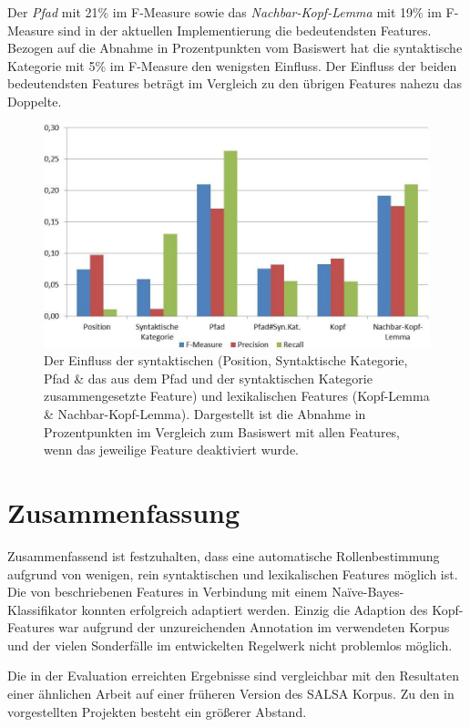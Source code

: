 \documentclass[12pt]{article}
\begin{document}
Der \textit{Pfad} mit 21\% im F-Measure sowie das \textit{Nachbar-Kopf-Lemma} mit 19\% im F-Measure sind in der aktuellen Implementierung die bedeutendsten Features. Bezogen auf die Abnahme in Prozentpunkten vom Basiswert hat die syntaktische Kategorie mit 5\% im F-Measure den wenigsten Einfluss. Der Einfluss der beiden bedeutendsten Features beträgt im Vergleich zu den übrigen Features nahezu das Doppelte.

	\begin{figure}[tb!]
		\centering		
		\includegraphics[scale=0.9]{images/featureImpact_sorted.jpg}
		\caption[Einfluss der genutzten Features]{Der Einfluss der syntaktischen (Position, Syntaktische Kategorie, Pfad \& das aus dem Pfad und der syntaktischen Kategorie zusammengesetzte Feature) und lexikalischen Features (Kopf-Lemma \& Nachbar-Kopf-Lemma). Dargestellt ist die Abnahme in Prozentpunkten im Vergleich zum Basiswert mit allen Features, wenn das jeweilige Feature deaktiviert wurde.}
		\label{featureImpact}
	\end{figure}

\newpage
\section{Zusammenfassung}

Zusammenfassend ist festzuhalten, dass eine automatische Rollenbestimmung
aufgrund von wenigen, rein syntaktischen und lexikalischen Features möglich ist.
Die von \cite{gildea} beschriebenen Features in Verbindung mit einem Naïve-Bayes-Klassifikator konnten erfolgreich adaptiert werden. Einzig die Adaption des Kopf-Features war aufgrund der unzureichenden Annotation im verwendeten Korpus und der vielen Sonderfälle im entwickelten Regelwerk nicht problemlos möglich.

Die in der Evaluation erreichten Ergebnisse sind vergleichbar mit den Resultaten
einer ähnlichen Arbeit auf einer früheren Version des SALSA Korpus. Zu den in
\cite{hajivc2009conll} vorgestellten Projekten besteht ein größerer Abstand.
\end{document}
